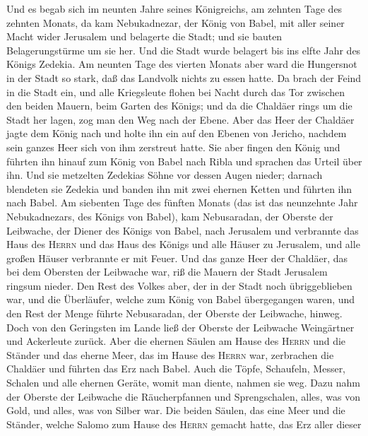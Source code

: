  Und es begab sich im neunten Jahre seines Königreichs, am
zehnten Tage des zehnten Monats, da kam Nebukadnezar, der König von
Babel, mit aller seiner Macht wider Jerusalem und belagerte die Stadt;
und sie bauten Belagerungstürme um sie her.  Und die Stadt
wurde belagert bis ins elfte Jahr des Königs Zedekia.  Am
neunten Tage des vierten Monats aber ward die Hungersnot in der Stadt so
stark, daß das Landvolk nichts zu essen hatte.  Da brach
der Feind in die Stadt ein, und alle Kriegsleute flohen bei Nacht durch
das Tor zwischen den beiden Mauern, beim Garten des Königs; und da die
Chaldäer rings um die Stadt her lagen, zog man den Weg nach der Ebene.
 Aber das Heer der Chaldäer jagte dem König nach und holte
ihn ein auf den Ebenen von Jericho, nachdem sein ganzes Heer sich von
ihm zerstreut hatte.  Sie aber fingen den König und
führten ihn hinauf zum König von Babel nach Ribla und sprachen das
Urteil über ihn.  Und sie metzelten Zedekias Söhne vor
dessen Augen nieder; darnach blendeten sie Zedekia und banden ihn mit
zwei ehernen Ketten und führten ihn nach Babel.  Am
siebenten Tage des fünften Monats (das ist das neunzehnte Jahr
Nebukadnezars, des Königs von Babel), kam Nebusaradan, der Oberste der
Leibwache, der Diener des Königs von Babel,  nach
Jerusalem und verbrannte das Haus des \textsc{Herrn} und das Haus des
Königs und alle Häuser zu Jerusalem, und alle großen Häuser verbrannte
er mit Feuer.  Und das ganze Heer der Chaldäer, das bei
dem Obersten der Leibwache war, riß die Mauern der Stadt Jerusalem
ringsum nieder.  Den Rest des Volkes aber, der in der
Stadt noch übriggeblieben war, und die Überläufer, welche zum König von
Babel übergegangen waren, und den Rest der Menge führte Nebusaradan, der
Oberste der Leibwache, hinweg.  Doch von den Geringsten
im Lande ließ der Oberste der Leibwache Weingärtner und Ackerleute
zurück.  Aber die ehernen Säulen am Hause des
\textsc{Herrn} und die Ständer und das eherne Meer, das im Hause des
\textsc{Herrn} war, zerbrachen die Chaldäer und führten das Erz nach
Babel.  Auch die Töpfe, Schaufeln, Messer, Schalen und
alle ehernen Geräte, womit man diente, nahmen sie weg. 
Dazu nahm der Oberste der Leibwache die Räucherpfannen und
Sprengschalen, alles, was von Gold, und alles, was von Silber war.
 Die beiden Säulen, das eine Meer und die Ständer, welche
Salomo zum Hause des \textsc{Herrn} gemacht hatte, das Erz aller dieser
